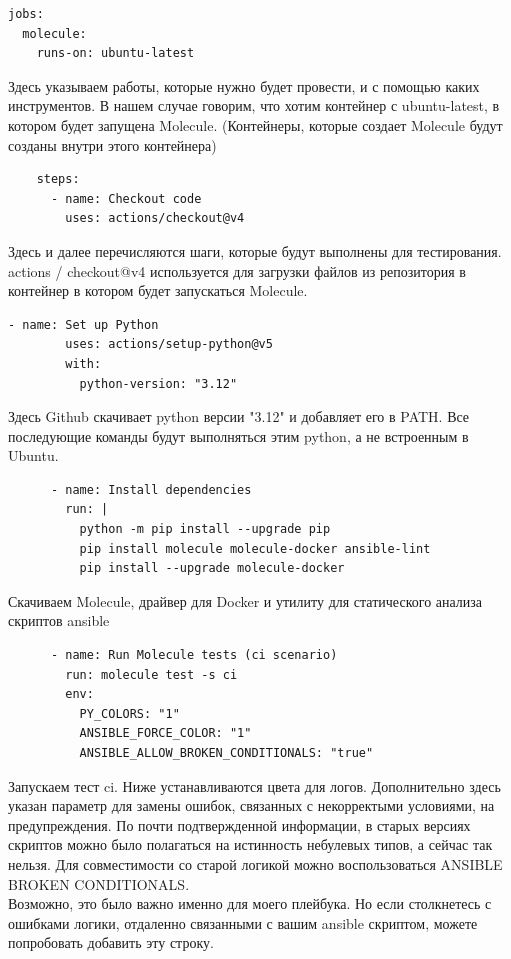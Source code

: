 \documentclass[12pt]{article}
\begin{document}
\begin{lstlisting}
jobs:
  molecule:
    runs-on: ubuntu-latest
\end{lstlisting}\par
Здесь указываем работы, которые нужно будет провести, и с помощью каких инструментов. В нашем случае говорим, что хотим контейнер с ubuntu-latest, в котором будет запущена Molecule. (Контейнеры, которые создает Molecule будут созданы внутри этого контейнера)
\begin{lstlisting}
    steps:
      - name: Checkout code
        uses: actions/checkout@v4
\end{lstlisting}\par
Здесь и далее перечисляются шаги, которые будут выполнены для тестирования.\\
actions / checkout@v4 используется для загрузки файлов из репозитория в контейнер в котором будет запускаться Molecule.\par\vspace{10pt}
\begin{lstlisting}
- name: Set up Python
        uses: actions/setup-python@v5
        with:
          python-version: "3.12"
\end{lstlisting}\par
Здесь Github скачивает python версии "3.12" и добавляет его в PATH. Все последующие команды будут выполняться этим python, а не встроенным в Ubuntu.\par\vspace{10pt}
\begin{lstlisting}
      - name: Install dependencies
        run: |
          python -m pip install --upgrade pip
          pip install molecule molecule-docker ansible-lint
          pip install --upgrade molecule-docker
\end{lstlisting}\par
Скачиваем Molecule, драйвер для Docker и утилиту для статического анализа скриптов ansible\par\vspace{10pt}
\newpage

\begin{lstlisting}
      - name: Run Molecule tests (ci scenario)
        run: molecule test -s ci
        env:
          PY_COLORS: "1"
          ANSIBLE_FORCE_COLOR: "1"
          ANSIBLE_ALLOW_BROKEN_CONDITIONALS: "true"
\end{lstlisting}\par
Запускаем тест ci. Ниже устанавливаются цвета для логов. 
Дополнительно здесь указан параметр для замены ошибок, связанных с некорректыми условиями, на предупреждения. По почти подтвержденной информации, в старых версиях скриптов можно было полагаться на истинность небулевых типов, а сейчас так нельзя. Для совместимости со старой логикой можно воспользоваться ANSIBLE BROKEN CONDITIONALS. \\
Возможно, это было важно именно для моего плейбука. Но если столкнетесь с ошибками логики, отдаленно связанными с вашим ansible скриптом, можете попробовать добавить эту строку.\par\vspace{10pt}
\end{document}
